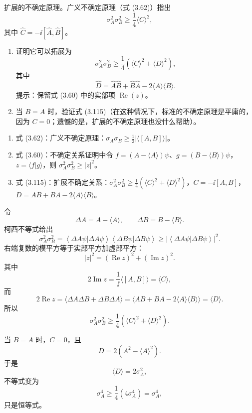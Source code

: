 \begin{question}
扩展的不确定原理。广义不确定原理（式 (3.62)）指出
\[
\sigma_A^2\sigma_B^2\geq \frac14\langle C\rangle^2,
\]
其中 $\hat C=-\ii[\hat A,\hat B]$。
\begin{enumerate}
\item 证明它可以拓展为
\[
\sigma_A^2\sigma_B^2\geq \frac14\left(\langle C\rangle^2+\langle D\rangle^2\right),\tag{3.115}
\]
其中
\[
\hat D=\hat A\hat B+\hat B\hat A-2\langle A\rangle\langle B\rangle.
\]
提示：保留式 (3.60) 中的实部项 $\operatorname{Re}(z)$。
\item 当 $B=A$ 时，验证式 (3.115)（在这种情况下，标准的不确定原理是平庸的，因为 $C=0$；遗憾的是，扩展的不确定原理也没什么帮助）。
\end{enumerate}

\par\smallskip
{}
\begin{enumerate}[leftmargin=2.2em,itemsep=0.12em,topsep=0.12em,parsep=0pt]
\item 式 (3.62)：广义不确定原理：$\sigma_A\sigma_B\ge \frac12|\langle[A,B]\rangle|$。
\item 式 (3.60)：不确定关系证明中令 $f=(A-\langle A\rangle)\psi$、$g=(B-\langle B\rangle)\psi$，$z=\langle f|g\rangle$，则 $\sigma_A^2\sigma_B^2\ge |z|^2$。
\item 式 (3.115)：扩展不确定关系：$\sigma_A^2\sigma_B^2\ge\frac14(\langle C\rangle^2+\langle D\rangle^2)$，$C=-\ii[A,B]$，$D=AB+BA-2\langle A\rangle\langle B\rangle$。
\end{enumerate}

\end{question}
\begin{solution}
令
\[
\Delta A=A-\langle A\rangle,
\qquad
\Delta B=B-\langle B\rangle.
\]
柯西不等式给出
\[
\sigma_A^2\sigma_B^2
=\left\langle \Delta A\psi|\Delta A\psi \right\rangle\left\langle \Delta B\psi|\Delta B\psi \right\rangle
\ge |\left\langle \Delta A\psi|\Delta B\psi \right\rangle|^2.
\]
右端复数的模平方等于实部平方加虚部平方：
\[
|z|^2=(\operatorname{Re}z)^2+(\operatorname{Im}z)^2.
\]
其中
\[
2\operatorname{Im}z=\frac1\ii\langle[A,B]\rangle=\langle C\rangle,
\]
而
\[
2\operatorname{Re}z
=\langle\Delta A\Delta B+\Delta B\Delta A\rangle
=\langle AB+BA-2\langle A\rangle\langle B\rangle\rangle
=\langle D\rangle.
\]
所以
\[
\boxed{\sigma_A^2\sigma_B^2\ge
\frac14\left(\langle C\rangle^2+\langle D\rangle^2\right).}
\]

当 $B=A$ 时，$C=0$，且
\[
D=2(A^2-\langle A\rangle^2).
\]
于是
\[
\langle D\rangle=2\sigma_A^2,
\]
不等式变为
\[
\sigma_A^4\ge \frac14(4\sigma_A^4)=\sigma_A^4,
\]
只是恒等式。
\end{solution}


